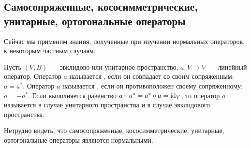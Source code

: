 \subsection{Самосопряженные, кососимметрические, унитарные,
  ортогональные операторы}

\nopagebreak

Сейчас мы применим знания, полученные при изучении нормальных
операторов, к некоторым частным случаям.

\begin{definition}
Пусть $(V,B)$~--- эвклидово или унитарное пространство,
$a\colon V\to V$~--- линейный оператор.
Оператор $a$ называется
, если он
совпадает со своим сопряженным: $a = a^*$. Оператор $a$ называется
, если он
противоположен своему сопряженному:
$a = -a^*$. Если выполняется равенство $a\circ a^* = a^*\circ a =
\operatorname{id}_V$, то оператор $a$ называется
 в случае унитарного
пространства и  в
случае эвклидового пространства.
\end{definition}

\begin{remark}
Нетрудно видеть, что самосопряженные, кососимметрические, унитарные,
ортогональные операторы являются нормальными.
\end{remark}

